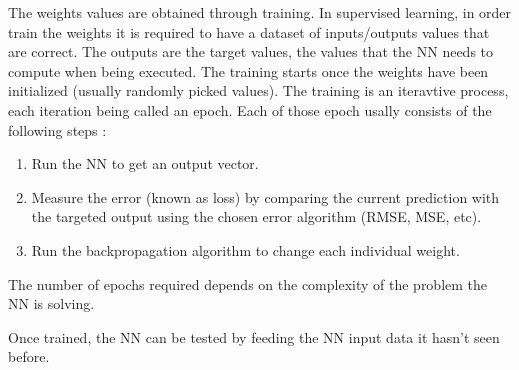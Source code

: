 The weights values are obtained through training. In supervised learning, in order train the weights it is required to have a dataset of inputs/outputs values that are correct. The outputs are the target values, the values that the \ac{NN} needs to compute when being executed. The training starts once the weights have been initialized (usually randomly picked values). The training is an iteravtive process, each iteration being called an epoch. Each of those epoch usally consists of the following steps :

\begin{enumerate}
  \item Run the \ac{NN} to get an output vector.\label{step:restart}
  \item Measure the error (known as loss) by comparing the current prediction with the targeted output using the chosen error algorithm (\ac{RMSE}, \ac{MSE}, etc).
  \item Run the backpropagation algorithm to change each individual weight.
\end{enumerate}

The number of epochs required depends on the complexity of the problem the \ac{NN} is solving.

Once trained, the \ac{NN} can be tested by feeding the \ac{NN} input data it hasn't seen before.
